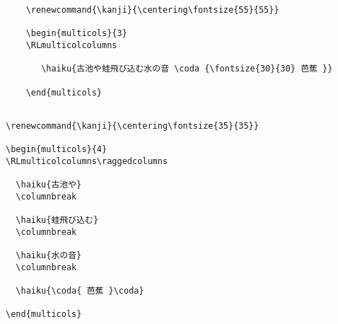 \documentclass[letterpaper]{article}
\begin{document}
	
		\vspace*{2cm}
	
	\renewcommand{\kanji}{\centering\fontsize{55}{55}}
	\begin{multicols}{3}
		\RLmulticolcolumns
		
		
	\end{multicols}
	
	\vspace*{1cm}
	
	\begin{verbatim}
	\renewcommand{\kanji}{\centering\fontsize{55}{55}}
	
	\begin{multicols}{3}
	\RLmulticolcolumns
	
	   \haiku{古池や蛙飛び込む水の音 \coda {\fontsize{30}{30} 芭蕉 }}
	
	\end{multicols}
	
	\end{verbatim}
	
	\pagebreak
	
	\vspace*{2cm}
			
	\renewcommand{\kanji}{\centering\fontsize{35}{35}}
	\begin{multicols}{4}
		\RLmulticolcolumns\raggedcolumns
		
		\columnbreak
		\columnbreak
		\columnbreak
			
	\end{multicols}

\vspace*{1cm}

\begin{verbatim}
\renewcommand{\kanji}{\centering\fontsize{35}{35}}

\begin{multicols}{4}
\RLmulticolcolumns\raggedcolumns

  \haiku{古池や}
  \columnbreak

  \haiku{蛙飛び込む}
  \columnbreak

  \haiku{水の音}
  \columnbreak

  \haiku{\coda{ 芭蕉 }\coda}

\end{multicols}

\end{verbatim}
	
\end{document}
